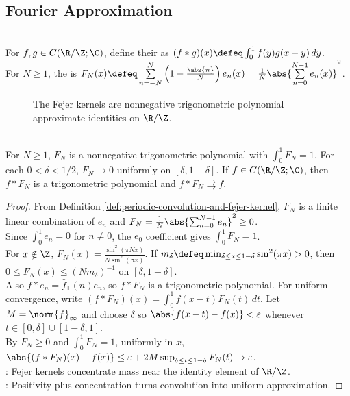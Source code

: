 \subsection{Fourier Approximation}

\begin{definition} \label{def:periodic-convolution-and-fejer-kernel} \\
For $f,g\in C(\R/\Z;\C)$, define their  as $(f*g)(x)\defeq\int_0^1 f(y)g(x-y)\,dy$.\\
For $N\geq1$, the  is $F_N(x)\defeq \sum\limits_{n=-N}^{N}\left(1-\frac{\abs{n}}{N}\right)e_n(x) =\frac{1}{N}\abs{\sum\limits_{n=0}^{N-1}e_n(x)}^2$.
\end{definition}

\begin{figure}[H]
  \centering
  
  \caption{The Fejer kernels are nonnegative trigonometric polynomial approximate identities on $\R/\Z$.}
  \label{fig:fejer-kernel-periodic-approx-identity}
\end{figure}

\begin{theorem} \label{thm:fejer-periodic-approximation-identity} \\
For $N\geq1$, $F_N$ is a nonnegative trigonometric polynomial with $\int_0^1F_N=1$. For each $0<\delta<1/2$, $F_N\to0$ uniformly on $[\delta,1-\delta]$. If $f\in C(\R/\Z;\C)$, then $f*F_N$ is a trigonometric polynomial and $f*F_N\rightrightarrows f$.
\begin{proof}
From Definition \ref{def:periodic-convolution-and-fejer-kernel}, $F_N$ is a finite linear combination of $e_n$ and $F_N=\frac1N\abs{\sum_{n=0}^{N-1}e_n}^2\geq0$.\\
Since $\int_0^1e_n=0$ for $n\neq0$, the $e_0$ coefficient gives $\int_0^1F_N=1$.\\
For $x\notin\Z$, $F_N(x)=\frac{\sin^2(\pi Nx)}{N\sin^2(\pi x)}$. If $m_\delta\defeq\min_{\delta\leq x\leq1-\delta}\sin^2(\pi x)>0$, then $0\leq F_N(x)\leq (Nm_\delta)^{-1}$ on $[\delta,1-\delta]$.\\
Also $f*e_n=\widehat f_{\mathbb{T}}(n)e_n$, so $f*F_N$ is a trigonometric polynomial. For uniform convergence, write $(f*F_N)(x)=\int_0^1f(x-t)F_N(t)\,dt$. Let $M=\norm{f}_\infty$ and choose $\delta$ so $\abs{f(x-t)-f(x)}<\varepsilon$ whenever $t\in[0,\delta]\cup[1-\delta,1]$.\\
By $F_N\geq0$ and $\int_0^1F_N=1$, uniformly in $x$, $\abs{(f*F_N)(x)-f(x)} \leq \varepsilon+2M\sup_{\delta\leq t\leq1-\delta}F_N(t)\to \varepsilon$.\\
: Fejer kernels concentrate mass near the identity element of $\R/\Z$.\\
: Positivity plus concentration turns convolution into uniform approximation.
\end{proof}
\end{theorem}

